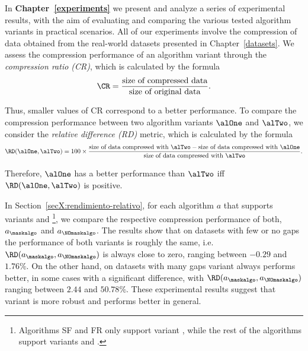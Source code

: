 In \textbf{Chapter~\ref{experiments}} we present and analyze a series of experimental results, with the aim of evaluating and comparing the various tested algorithm variants in practical scenarios. All of our experiments involve the compression of data obtained from the real-world datasets presented in Chapter~\ref{datasets}. We assess the compression performance of an algorithm variant through the \textit{compression ratio (CR)}, which is calculated by the formula
\vspace{-2pt}
\begin{equation}
\CR = \frac{\textnormal{size of compressed data}}{\textnormal{size of original data}}.
\end{equation}


\clearpage


Thus, smaller values of CR correspond to a better performance. To compare the compression performance between two algorithm variants $\alOne$ and $\alTwo$, we consider the \textit{relative difference (RD)} metric, which is calculated by the formula
\vspace{-2pt}
\newcommand{\sizeofd}{\textnormal{size of data compressed with }}
\begin{equation}
\RD(\alOne, \alTwo) = 100\times\frac{\sizeofd \alTwo - \sizeofd \alOne}{\sizeofd \alTwo}.
\end{equation}

\vspace{-2pt}
Therefore, $\alOne$ has a better performance than $\alTwo$ iff $\RD(\alOne, \alTwo)$ is positive.


\newcommand{\footSupportBoth}{\footnote{Algorithms SF and FR only support variant \maskalgo, while the rest of the algorithms support variants \maskalgo and \NOmaskalgo.}}


In Section~\ref{secX:rendimiento-relativo}, for each algorithm $a$ that supports variants \maskalgo and \NOmaskalgo\footSupportBoth, we compare the respective compression performance of both, $a_\maskalgo$ and $a_\NOmaskalgo$. The results show that on datasets with few or no gaps the performance of both variants is roughly the same, i.e. $\RD(a_\maskalgo, a_\NOmaskalgo)$ is always close to zero, ranging between $-0.29$ and $1.76\%$. On the other hand, on datasets with many gaps variant \maskalgo always performs better, in some cases with a significant difference, with $\RD(a_\maskalgo, a_\NOmaskalgo)$ ranging between $2.44$ and $50.78\%$. These experimental results suggest that variant \maskalgo is more robust and performs better in general.


